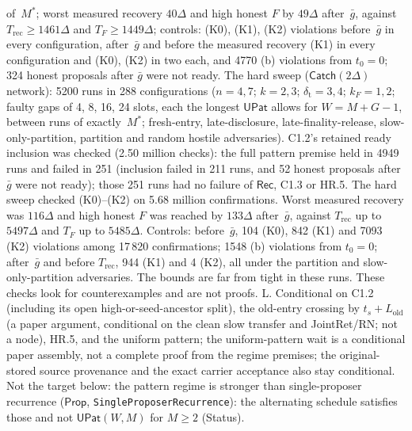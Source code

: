 \documentclass{article}
\begin{document}
{of~$M^*$; worst measured recovery $40\Delta$ and high honest $F$ by $49\Delta$
after~$\bar g$, against $T_{\mathrm{rec}}\geq1461\Delta$ and
$T_F\geq1449\Delta$; controls: (K0), (K1), (K2) violations before~$\bar g$ in
every configuration, after~$\bar g$ and before the measured recovery (K1) in
every configuration and (K0), (K2) in two each, and 4770 (b) violations from
$t_0=0$; 324 honest proposals after $\bar g$ were not ready.  The hard sweep
($\mathsf{Catch}(2\Delta)$ network): 5200 runs in 288
configurations ($n=4,7$; $k=2,3$; $\delta_{\mathrm t}=3,4$; $k_F=1,2$; faulty
gaps of 4, 8, 16, 24 slots, each the longest $\mathsf{UPat}$ allows for
$W=M+G-1$, between runs of exactly~$M^*$; fresh-entry, late-disclosure,
late-finality-release, slow-only-partition, partition and random hostile
adversaries).  C1.2's retained ready inclusion was checked (2.50 million
checks): the full pattern premise held in 4949 runs and failed in 251
(inclusion failed in 211 runs, and 52 honest proposals after $\bar g$ were not
ready); those 251 runs had no failure of $\mathsf{Rec}$, C1.3 or HR.5.  The
hard sweep checked (K0)--(K2) on 5.68 million confirmations.  Worst measured
recovery was $116\Delta$ and high honest $F$ was reached by $133\Delta$
after~$\bar g$, against $T_{\mathrm{rec}}$ up to $5497\Delta$ and $T_F$ up to
$5485\Delta$.  Controls: before~$\bar g$, 104 (K0), 842 (K1) and 7093 (K2)
violations among 17\,820 confirmations; 1548 (b) violations from $t_0=0$;
after~$\bar g$ and before $T_{\mathrm{rec}}$, 944 (K1) and 4 (K2), all under
the partition and slow-only-partition adversaries.  The bounds are far from
tight in these runs.  These checks look for counterexamples and are not proofs.}
{L.  Conditional on C1.2 (including its open high-or-seed-ancestor split), the
old-entry crossing by $t_s+L_{\mathrm{old}}$ (a paper argument, conditional on
the clean slow transfer and JointRet/RN; not a node), HR.5,
and the uniform pattern; the uniform-pattern wait is a conditional paper
assembly, not a complete proof from the
regime premises; the original-stored source provenance and the exact carrier
acceptance also stay conditional.  Not the
target below: the pattern regime is stronger than single-proposer recurrence
($\mathsf{Prop}$, \texttt{SingleProposerRecurrence}): the alternating schedule
satisfies those and not $\mathsf{UPat}(W,M)$ for $M\geq2$ (Status).}
\end{document}

